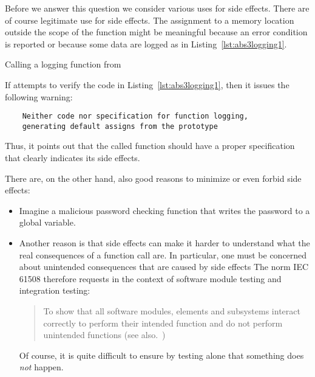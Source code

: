 \FloatBarrier

Before we answer this question we consider various uses for side effects.
There are of course legitimate use for side effects.
The assignment to a memory location outside the scope of the function
might be meaningful because an error condition is reported or because
some data are logged as in Listing~\ref{lst:abs3logging1}.

\begin{listing}[hbt]
\begin{minipage}{\textwidth}

\end{minipage}
\caption{\label{lst:abs3logging1} Calling a logging function from }
\end{listing}

If \framacwp attempts to verify the code in Listing~\ref{lst:abs3logging1},
then it issues the following warning:
%
\begin{small}
\begin{verbatim}
    Neither code nor specification for function logging,
    generating default assigns from the prototype
\end{verbatim}
\end{small}
%
Thus, it points out that the called function  should have a proper
specification that clearly indicates its side effects.

There are, on the other hand, also good reasons to minimize or even forbid side 
effects:

\begin{itemize}
\item
Imagine a malicious password checking function that writes the password to
a global variable.

\item
Another reason is that side effects can make it harder to understand what 
the real consequences of a function call are.
In particular, one must be concerned about unintended consequences that
are caused by side effects
The norm IEC 61508 therefore requests in the context of software module testing
and integration testing:

\begin{quote}
To show that all software modules,
elements and subsystems interact correctly
to perform their intended function and do not perform unintended functions
(see also.~\cite[\S 7.4.7.2,\S 7.7.2.9]{IEC-61508-3})
\end{quote}

Of course, it is quite difficult to ensure by testing alone that something does \emph{not} happen.
\end{itemize}

